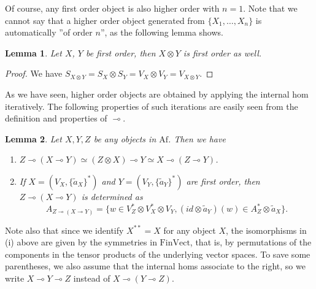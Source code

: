 \documentclass[12pt]{article}
\newtheorem{lemma}{Lemma}
\theoremstyle{definition}
\theoremstyle{remark}
\def \Af{\mathrm{Af}}
\def \FV{\mathrm{FinVect}}
\begin{document}
Of course, any first order
object is also higher order with $n=1$. Note that we cannot say that a higher order object
generated from $\{X_1,\dots, X_n\}$ is automatically ''of order $n$'', as the following lemma shows. 

\begin{lemma}\label{lemma:1ordertensor} Let $X$, $Y$ be first order, then $X\otimes Y$ is
first order as well.

\end{lemma}

\begin{proof} We have $S_{X\otimes Y}=S_X\otimes S_Y=V_X\otimes V_Y=V_{X\otimes Y}$.

\end{proof}

As we have seen, higher order objects are obtained by applying the internal hom
iteratively. The following properties of such iterations are easily seen from the
definition and properties of $\multimap$. 

\begin{lemma}\label{lemma:combs} Let $X,Y,Z$ be any objects in $\Af$. Then we have
\begin{enumerate}
\item[(i)] $Z\multimap (X\multimap Y)\simeq (Z\otimes X)\multimap Y\simeq X\multimap
(Z\multimap Y)$.
\item[(ii)] If $X=(V_X,\{\tilde a_X\}^*)$ and $Y=(V_Y, \{\tilde a_Y\}^*)$ are first order, 
then $Z\multimap (X\multimap Y)$ is determined as
\[
A_{Z\multimap (X\multimap Y)}=\{w\in V_{Z}^*\otimes V_X^*\otimes V_Y, (id\otimes \tilde a_Y)(w)\in
A_Z^*\otimes \tilde a_X\}.
\]

\end{enumerate}


\end{lemma}

Note also that since we identify $X^{**}=X$ for any object $X$, the isomorphisms in (i)
above are given by the symmetries in $\FV$, that is, by permutations of the components in
the tensor products of the underlying vector spaces. To save some parentheses, we also
assume that the internal homs associate to the right, so we write
$X\multimap Y\multimap Z$ instead of $X\multimap (Y\multimap Z)$. 
\end{document}
